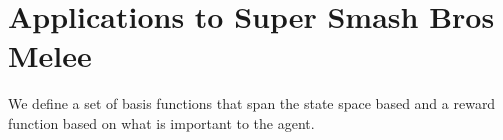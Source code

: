 \section{Applications to Super Smash Bros Melee}

We define a set of basis functions that span the state space based and a reward function based on what is important to the agent. 